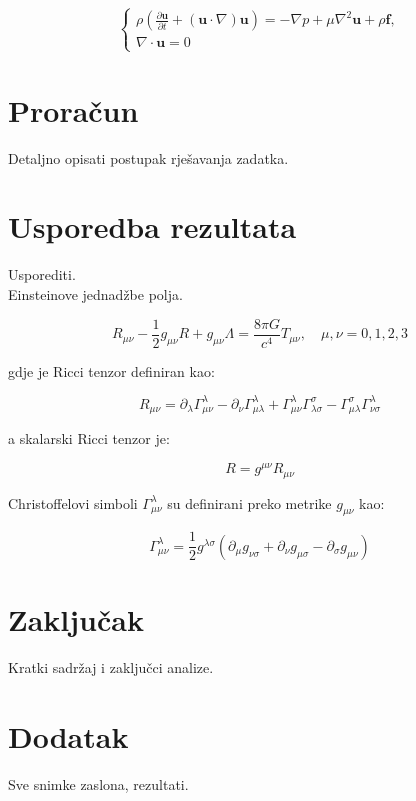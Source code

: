 \documentclass[a4paper,12pt]{article}
\begin{document}
\begin{equation}
\begin{cases}
\rho \left( \frac{\partial \mathbf{u}}{\partial t} + (\mathbf{u} \cdot \nabla) \mathbf{u} \right) = - \nabla p + \mu \nabla^2 \mathbf{u} + \rho \mathbf{f}, \\[0.5em]
\nabla \cdot \mathbf{u} = 0
\end{cases}
\end{equation}


\section{Proračun}
Detaljno opisati postupak rješavanja zadatka.\cite{lanczos1986}


\section{Usporedba rezultata}
Usporediti.\\

Einsteinove jednadžbe polja. 

\begin{equation}
R_{\mu\nu} - \frac{1}{2} g_{\mu\nu} R + g_{\mu\nu} \Lambda = \frac{8 \pi G}{c^4} T_{\mu\nu}, \quad \mu,\nu = 0,1,2,3
\end{equation}

\noindent gdje je Ricci tenzor definiran kao:

\begin{equation}
R_{\mu\nu} = \partial_\lambda \Gamma^\lambda_{\mu\nu} - \partial_\nu \Gamma^\lambda_{\mu\lambda} + \Gamma^\lambda_{\mu\nu} \Gamma^\sigma_{\lambda\sigma} - \Gamma^\sigma_{\mu\lambda} \Gamma^\lambda_{\nu\sigma}
\end{equation}

\noindent a skalarski Ricci tenzor je:

\begin{equation}
R = g^{\mu\nu} R_{\mu\nu}
\end{equation}

\noindent Christoffelovi simboli \(\Gamma^\lambda_{\mu\nu}\) su definirani preko metrike \(g_{\mu\nu}\) kao:

\begin{equation}
\Gamma^\lambda_{\mu\nu} = \frac{1}{2} g^{\lambda\sigma} \left( \partial_\mu g_{\nu\sigma} + \partial_\nu g_{\mu\sigma} - \partial_\sigma g_{\mu\nu} \right)
\end{equation}



\section{Zaključak}
Kratki sadržaj i zaključci analize.

\section{Dodatak}
Sve snimke zaslona, rezultati.

\newpage
{}


\end{document}
